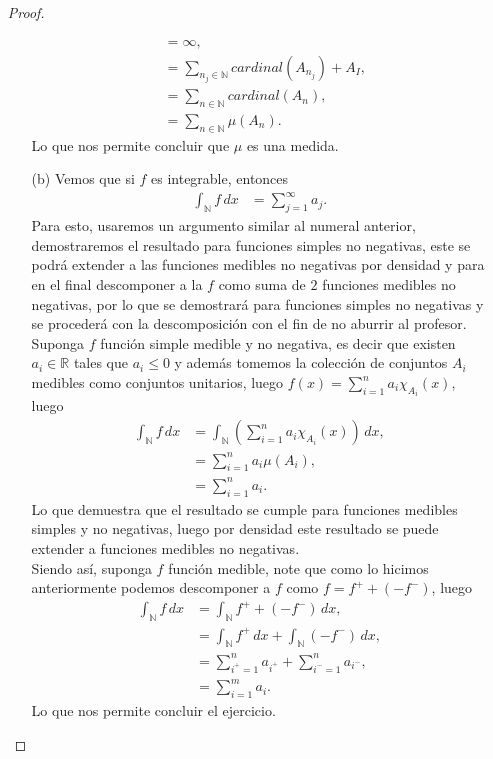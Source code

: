 \begin{enumerate}
\begin{proof}
\begin{enumerate}
\begin{align*}
        &=\infty,\\
        &=\sum_{n_{j}\in\mathbb{N}}cardinal\left( A_{n_{j}} \right)+A_{I},\\
        &=\sum_{n\in\mathbb{N}}cardinal\left( A_{n} \right),\\
        &=\sum_{n\in\mathbb{N}}\mu(A_{n}).
      \end{align*}
      Lo que nos permite concluir que $\mu$ es una medida.\\
    \item[(b)] Vemos que si $f$ es integrable, entonces
      \begin{align*}
        \int_{\mathbb{N}}f\, dx&=\sum_{j=1}^{\infty}a_{j}.
      \end{align*}
      Para esto, usaremos un argumento similar al numeral anterior, demostraremos el resultado para funciones simples no negativas, este se podrá extender a las funciones medibles no negativas por densidad y para en el final descomponer a la $f$ como suma de $2$ funciones medibles no negativas, por lo que se demostrará para funciones simples no negativas y se procederá con la descomposición con el fin de no aburrir al profesor.\\
      Suponga $f$ función simple medible y no negativa, es decir que existen $a_{i}\in\mathbb{R}$ tales que $a_{i}\leq 0$ y además tomemos la colección de conjuntos $A_{i}$ medibles como conjuntos unitarios, luego $f(x)=\sum_{i=1}^{n}a_{i}\chi_{A_{i}}(x)$, luego
      \begin{align*}
        \int_{\mathbb{N}}f\, dx&=\int_{\mathbb{N}}\left( \sum_{i=1}^{n}a_{i}\chi_{A_{i}}(x) \right)\, dx,\\
        &=\sum_{i=1}^{n}a_{i}\mu(A_{i}),\\
        &=\sum_{i=1}^{n}a_{i}.
      \end{align*}
      Lo que demuestra que el resultado se cumple para funciones medibles simples y no negativas, luego por densidad este resultado se puede extender a funciones medibles no negativas.\\
      Siendo así, suponga $f$ función medible, note que como lo hicimos anteriormente podemos descomponer a $f$ como $f=f^{+} + (-f^{-})$, luego
      \begin{align*}
        \int_{\mathbb{N}}f\, dx&=\int_{\mathbb{N}}f^{+}+(-f^-)\, dx,\\
        &=\int_{\mathbb{N}}f^+\, dx + \int_{\mathbb{N}}(-f^-)\, dx,\\
        &=\sum_{i^+=1}^{n}a_{i^{+}}+\sum_{i^{-}=1}^{n}a_{i^{-}},\\
        &=\sum_{i=1}^{m}a_{i}.
      \end{align*}
      Lo que nos permite concluir el ejercicio.
  \end{enumerate}
\end{proof}
\end{enumerate}


